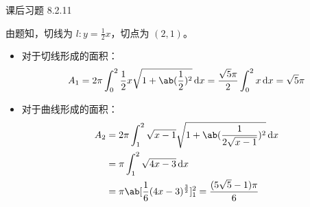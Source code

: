 \begin{problem}
	课后习题 8.2.11

	\begin{solution}
		由题知，切线为 $l: y = \frac{1}{2} x$，切点为 $(2, 1)$。

		\begin{itemize}
			\item 对于切线形成的面积：
			$$
			A_1 = 2\pi \int_0^2 \frac{1}{2} x \sqrt{1 + \ab(\frac{1}{2})^2} \dd{x} = \frac{\sqrt{5} \pi}{2} \int_0^2 x \dd{x} = \sqrt{5} \pi
			$$

			\item 对于曲线形成的面积：
			$$
			\begin{aligned}
				A_2 & = 2\pi \int_1^2 \sqrt{x - 1} \sqrt{1 + \ab(\frac{1}{2 \sqrt{x - 1}})^2} \dd{x} \\
				& = \pi \int_1^2 \sqrt{4x - 3} \dd{x} \\
				& = \pi \ab[\frac{1}{6} (4x - 3)^{\frac{3}{2}}]_1^2 = \frac{(5 \sqrt{5} - 1)\pi}{6}
			\end{aligned}
			$$
		\end{itemize}
	\end{solution}
\end{problem}

